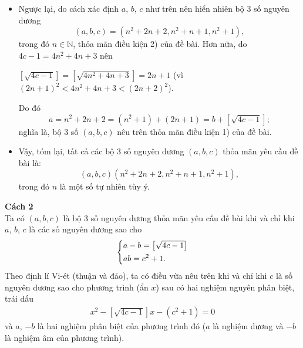 \begin{bt}
{\begin{itemize}
\begin{align*}
				k \leq \sqrt{4(b + n) - 1} - 2n.
			\end{align*}
			Từ đó, do $b \leq n^2 + 1$, suy ra
		$k \leq \sqrt{4(n^2 + n + 1) - 1} - 2n$.\hfill$(6)$\\
		Ta có:
		$(6) \Leftrightarrow (k + 2n)^2 \leq 4n^2 + 4n + 3 \Leftrightarrow k^2 + 4n(k - 1) \leq 3$.\hfill$(7)$\\
Vì $n \in \mathbb{N}$ và $k \in \mathbb{N}^*$ nên từ $(7)$ suy ra $k^2 \leq 3$.
			Do đó, $k = 1$. Dẫn tới
			{\allowdisplaybreaks
			\begin{align*}
		&b = n^2 + 1, \,\, c = b + n = n^2 + n + 1\\
		&a = \dfrac{c^2 + 1}{b} = \dfrac{(n^2 + n + 1) + 1}{n^2 + 1} = n^2 + 2n + 2,
		\end{align*}}với $n$ là một số tự nhiên.
			\item Ngược lại, do cách xác định $a$, $b$, $c$ như trên nên hiển nhiên bộ $3$ số nguyên dương
			$$(a, b, c) = (n^2 + 2n + 2, n^2 + n + 1, n^2 + 1),$$
			trong đó $n \in \mathbb{N}$, thỏa mãn điều kiện 2) của đề bài. Hơn nữa, do $4c - 1 = 4n^2 + 4n + 3$ nên
			\begin{center}
				$\left[\sqrt{4c - 1}\right] = \left[\sqrt{4n^2 + 4n + 3}\right] = 2n + 1$
				(vì $(2n + 1)^2 < 4n^2 + 4n + 3 < (2n + 2)^2$).
			\end{center}
			Do đó
			$$a = n^2 + 2n + 2 = (n^2 + 1) + (2n + 1) = b + \left[\sqrt{4c - 1}\right];$$
			nghĩa là, bộ $3$ số $(a, b, c)$ nêu trên thỏa mãn điều kiện 1) của đề bài.
			\item Vậy, tóm lại, tất cả các bộ $3$ số nguyên dương $(a, b, c)$ thỏa mãn yêu cầu đề bài là:
			$$(a,b,c)(n^2 + 2n + 2, n^2 + n + 1, n^2 + 1),$$
			trong đó $n$ là một số tự nhiên tùy ý.
		\end{itemize}
		\textbf{Cách 2} \\
		Ta có $(a, b, c)$ là bộ $3$ số nguyên dương thỏa mãn yêu cầu đề bài khi và chỉ khi $a$, $b$, $c$ là các số nguyên dương sao cho
		$$\left\{\begin{aligned}&a - b = \left[\sqrt{4c - 1}\right] \\ &ab = c^2 + 1.\end{aligned}\right.$$
		Theo định lí Vi-ét (thuận và đảo), ta có điều vừa nêu trên khi và chỉ khi $c$ là số nguyên dương sao cho phương trình (ẩn $x$) sau có hai nghiệm nguyên phân biệt, trái dấu
		\begin{align}
			x^2 - \left[\sqrt{4c - 1}\right]x - (c^2 + 1) = 0 \tag{*}
		\end{align}
		và $a$, $-b$ là hai nghiệm phân biệt của phương trình đó ($a$ là nghiệm dương và $-b$ là nghiệm âm của phương trình).\\
}
\end{bt}

